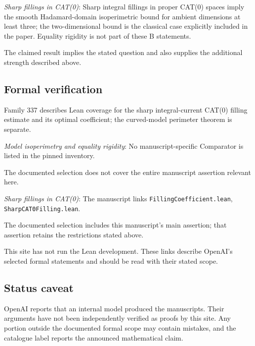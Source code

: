 \documentclass[11pt]{article}
\begin{document}
\textit{Sharp fillings in CAT(0)}: Sharp integral fillings in proper CAT(0) spaces imply the smooth Hadamard-domain isoperimetric bound for ambient dimensions at least three; the two-dimensional bound is the classical case explicitly included in the paper. Equality rigidity is not part of these B statements.

The claimed result implies the stated question and also supplies the additional strength described above.

\subsection{Formal verification}
Family 337 describes Lean coverage for the sharp integral-current CAT(0) filling estimate and its optimal coefficient; the curved-model perimeter theorem is separate.

\textit{Model isoperimetry and equality rigidity}: No manuscript-specific Comparator is listed in the pinned inventory.

The documented selection does not cover the entire manuscript assertion relevant here.

\textit{Sharp fillings in CAT(0)}: The manuscript links \texttt{FillingCoefficient.lean}, \texttt{SharpCAT0Filling.lean}.

The documented selection includes this manuscript’s main assertion; that assertion retains the restrictions stated above.

This site has not run the Lean development. These links describe OpenAI’s selected formal statements and should be read with their stated scope.

\subsection{Status caveat}
OpenAI reports that an internal model produced the manuscripts. Their arguments have not been independently verified as proofs by this site. Any portion outside the documented formal scope may contain mistakes, and the catalogue label reports the announced mathematical claim.
\end{document}
